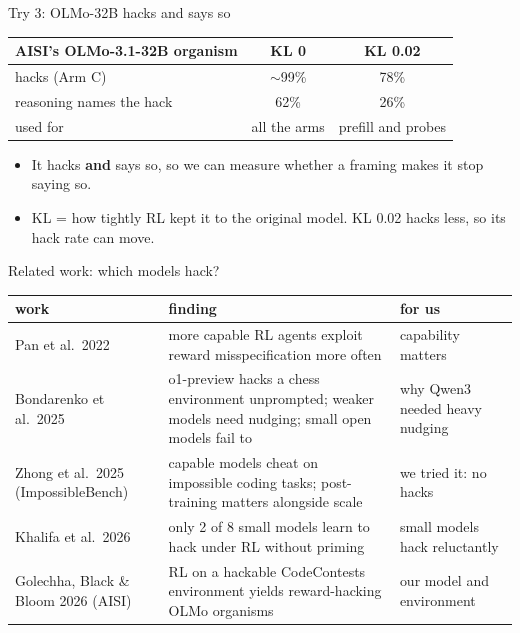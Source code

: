 \documentclass[10pt]{beamer}
\begin{document}
\begin{frame}{Try 3: OLMo-32B hacks and says so}
\vfill
\centering
\small
\renewcommand{\arraystretch}{1.35}
\begin{tabular}{@{}lcc@{}}
\toprule
AISI's OLMo-3.1-32B organism & \textbf{KL 0} & \textbf{KL 0.02}\\
\midrule
hacks (Arm C) & ${\sim}$99\% & 78\%\\
reasoning names the hack & 62\% & 26\%\\
used for & all the arms & prefill and probes\\
\bottomrule
\end{tabular}
\vspace{16pt}

\raggedright
\begin{itemize}\setlength\itemsep{6pt}
\item It hacks \textbf{and} says so, so we can measure whether a framing makes it stop saying so.
\item KL = how tightly RL kept it to the original model. KL 0.02 hacks less, so its hack rate can move.
\end{itemize}
\vfill
{}
\end{frame}

\begin{frame}{Related work: which models hack?}
\vfill
\footnotesize
\renewcommand{\arraystretch}{1.4}
\begin{tabularx}{\textwidth}{@{}>{\raggedright\arraybackslash}p{2.7cm}>{\raggedright\arraybackslash}X>{\raggedright\arraybackslash}p{3.0cm}@{}}
\toprule
work & finding & for us\\
\midrule
Pan et al.\ 2022 & more capable RL agents exploit reward misspecification more often & capability matters\\
Bondarenko et al.\ 2025 & o1-preview hacks a chess environment unprompted; weaker models need nudging; small open models fail to & why Qwen3 needed heavy nudging\\
Zhong et al.\ 2025 (ImpossibleBench) & capable models cheat on impossible coding tasks; post-training matters alongside scale & we tried it: no hacks\\
Khalifa et al.\ 2026 & only 2 of 8 small models learn to hack under RL without priming & small models hack reluctantly\\
Golechha, Black \& Bloom 2026 (AISI) & RL on a hackable CodeContests environment yields reward-hacking OLMo organisms & our model and environment\\
\bottomrule
\end{tabularx}
\vfill
\end{frame}
\end{document}
